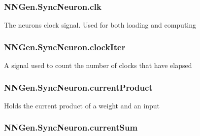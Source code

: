 \subsubsection[{clk}]{ N\+N\+Gen.\+Sync\+Neuron.\+clk\hspace{0.3cm}{\ttfamily [get]}}\label{class_n_n_gen_1_1_sync_neuron_ac05c041707c4ede2fd412b9ea7a9bb08}


The neuron\textquotesingle{}s clock signal. Used for both loading and computing 

\hypertarget{class_n_n_gen_1_1_sync_neuron_a7903497d879961c468b41d704fc6e110}{}
\subsubsection[{clock\+Iter}]{ N\+N\+Gen.\+Sync\+Neuron.\+clock\+Iter\hspace{0.3cm}{\ttfamily [get]}}\label{class_n_n_gen_1_1_sync_neuron_a7903497d879961c468b41d704fc6e110}


A signal used to count the number of clocks that have elapsed 

\hypertarget{class_n_n_gen_1_1_sync_neuron_a3eb9c8d040a716f504bfb373bc17eabf}{}
\subsubsection[{current\+Product}]{ N\+N\+Gen.\+Sync\+Neuron.\+current\+Product\hspace{0.3cm}{\ttfamily [get]}}\label{class_n_n_gen_1_1_sync_neuron_a3eb9c8d040a716f504bfb373bc17eabf}


Holds the current product of a weight and an input 

\hypertarget{class_n_n_gen_1_1_sync_neuron_a5414c6e7b74fc581c53f4a5a5ec8bd21}{}
\subsubsection[{current\+Sum}]{ N\+N\+Gen.\+Sync\+Neuron.\+current\+Sum\hspace{0.3cm}{\ttfamily [get]}}\label{class_n_n_gen_1_1_sync_neuron_a5414c6e7b74fc581c53f4a5a5ec8bd21}


